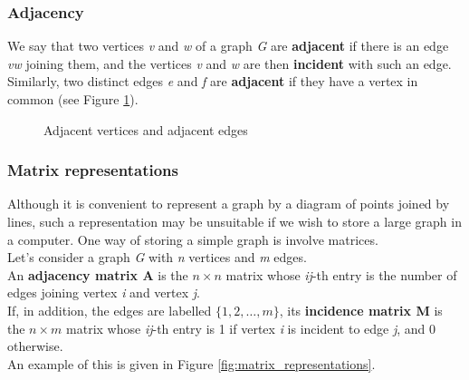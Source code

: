 \subsubsection{Adjacency}
We say that two vertices \textit{v} and \textit{w} of a graph \textit{G} are \textbf{adjacent} if there is an edge \textit{vw} joining them, and the vertices \textit{v} and \textit{w} are then \textbf{incident} with such an edge. \\
Similarly, two distinct edges \textit{e} and \textit{f} are \textbf{adjacent} if they have a vertex in common (see Figure \ref{fig:adiacency}).

\begin{figure}[H]
    \centering
    \quad %
    \caption{Adjacent vertices and adjacent edges}
    \label{fig:adiacency}
\end{figure}

\subsubsection{Matrix representations}
Although it is convenient to represent a graph by a diagram of points joined by lines,
such a representation may be unsuitable if we wish to store a large graph in a computer.
One way of storing a simple graph is involve matrices. \\
Let's consider a graph \textit{G} with \textit{n} vertices and \textit{m} edges. \\
An \textbf{adjacency matrix A} is the $n \times n$ matrix whose \textit{ij}-th entry is the number of edges joining vertex \textit{i} and vertex \textit{j}. \\
If, in addition, the edges are labelled $\{1, 2, \dots, m\}$, its \textbf{incidence matrix M} is the $n \times m$ matrix whose \textit{ij}-th entry is 1 if vertex \textit{i} is incident to edge \textit{j}, and 0 otherwise. \\
An example of this is given in Figure \ref{fig:matrix_representations}.

